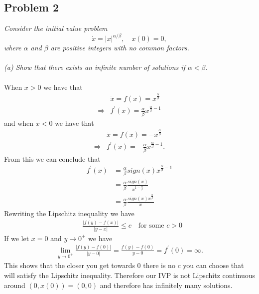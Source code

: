 \documentclass[12pt]{article}
\theoremstyle{remark}
\begin{document}
 	\newpage
 	
 	\subsection*{Problem 2}
 	
 	\textit{Consider the initial value problem}
 	$$ \dot{x} = \vert x \vert^{\alpha/\beta}, \quad x(0) = 0, $$
 	\textit{where $\alpha$ and $\beta$ are positive integers with no common factors.} \\ \\
 	\textit{(a) Show that there exists an infinite number of solutions if $\alpha < \beta$.} \\ \\
 	When $x > 0$ we have that 
 	\begin{align*}
 	& \dot{x} = f(x) = x^{\frac{\alpha}{\beta}} \\
 	\Rightarrow & f^\prime(x) = \frac{\alpha}{\beta}x^{\frac{\alpha}{\beta} - 1} 
 	\end{align*}
 	and when $x < 0$ we have that
 	\begin{align*}
 	& \dot{x} = f(x) = -x^{\frac{\alpha}{\beta}} \\
 	\Rightarrow & f^\prime (x) = -\frac{\alpha}{\beta}x^{\frac{\alpha}{\beta} - 1}.
 	\end{align*}
 	From this we can conclude that 
 	\begin{align*}
 	f^\prime(x) & = \frac{\alpha}{\beta}sign(x)x^{\frac{\alpha}{\beta} - 1} \\
 	& = \frac{\alpha}{\beta}\frac{sign(x)}{x^{1-\frac{\alpha}{\beta}}} \\
 	& = \frac{\alpha}{\beta}\frac{sign(x)x^{\frac{\alpha}{\beta}}}{x}
 	\end{align*}
 	Rewriting the Lipschitz inequality we have
 	\begin{align*}
 	& \frac{\vert f(y) - f(x) \vert}{\vert y - x \vert} \leq c \quad \text{for some } c > 0
 	\end{align*}
 	If we let $x = 0$ and $y \rightarrow 0^+$ we have
 	\begin{align*}
 	\lim\limits_{y \rightarrow 0^+} \frac{\vert f(y) - f(0) \vert}{ \vert y - 0 \vert} =\frac{f(y) - f(0)}{y - 0} = f^\prime(0) = \infty. 
 	\end{align*}
 	This shows that the closer you get towards 0 there is no $c$ you can choose that will satisfy the Lipschitz inequality. Therefore our IVP is not Lipschitz continuous around $(0, x(0)) = (0,0)$ and therefore has infinitely many solutions. \\ \\
 	
\end{document}
